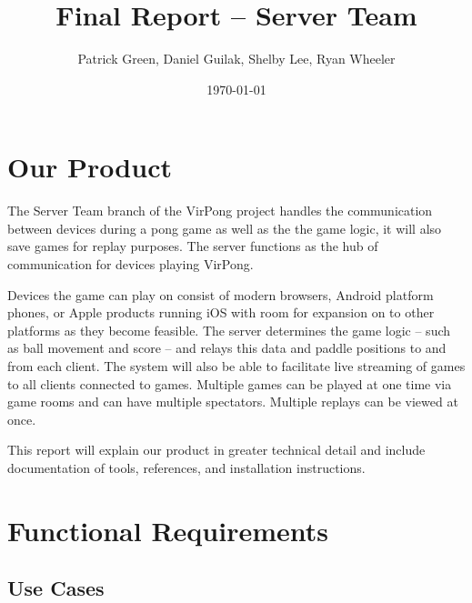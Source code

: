 \documentclass[letterpaper,12pt]{article}
\begin{document}
\title{Final Report -- Server Team}
\author{Patrick Green, Daniel Guilak, Shelby Lee, Ryan Wheeler}
\date{\today}
\maketitle
\newpage

\tableofcontents

\section{Our Product}
The Server Team branch of the VirPong project handles the communication between devices during a pong game as well as the the game logic, it will also save games for replay purposes. The server functions as the hub of communication for devices playing VirPong.


Devices the game can play on consist of modern browsers, Android platform phones, or Apple products running iOS with room for expansion on to other platforms as they become feasible. The server determines the game logic -- such as ball movement and score --  and relays this data and paddle positions to and from each client. The system will also be able to facilitate live streaming of games to all clients connected to games. Multiple games can be played at one time via game rooms and can have multiple spectators. Multiple replays can be viewed at once. 

This report will explain our product in greater technical detail and include documentation of tools, references, and installation instructions. 

\section{Functional Requirements}

\subsection{Use Cases}
\end{document}
